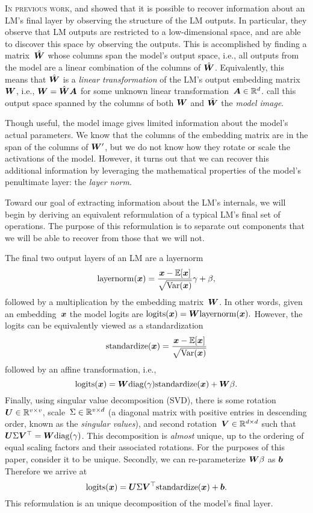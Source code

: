 \documentclass{article}
\newcommand\layernorm{\mathrm{layernorm}}
\newcommand\standardize{\mathrm{standardize}}
\newcommand\logits{\mathrm{logits}}
\newcommand\diag{\mathrm{diag}}
\begin{document}
\lettrine{I}{n previous work,} \citet{Finlayson2024LogitsOA} and \citet{Carlini2024StealingPO} showed that it is possible to recover information about an LM's final layer by observing the structure of the LM outputs.
In particular, they observe that LM outputs are restricted to a low-dimensional space, and are able to discover this space by observing the outputs.
This is accomplished by finding a matrix~\(\hat{{\bm{W}}}\) whose columns span the model's output space, i.e., all outputs from the model are a linear combination of the columns of \(\hat{{\bm{W}}}\).
Equivalently, this means that \(\hat{{\bm{W}}}\) is a \emph{linear transformation} of the LM's output embedding matrix~\({\bm{W}}\), i.e., \({\bm{W}}=\hat{{\bm{W}}}{\bm{A}}\) for some unknown linear transformation~\({\bm{A}}\in\mathbb{R}^d\).
\citeauthor{Finlayson2024LogitsOA} call this output space spanned by the columns of both \({\bm{W}}\) and \(\hat{{\bm{W}}}\) the \textit{model image}. 

Though useful, the model image gives limited information about the model's actual parameters.
We know that the columns of the embedding matrix are in the span of the columns of \({\bm{W}}'\),
but we do not know how they rotate or scale the activations of the model.
However, it turns out that we can recover this additional information by leveraging the mathematical properties of the model's penultimate layer: the \textit{layer norm}.

Toward our goal of extracting information about the LM's internals,
we will begin by deriving an equivalent reformulation 
of a typical LM's final set of operations.
The purpose of this reformulation is to separate out components 
that we will be able to recover from those that we will not.

The final two output layers of an LM are a layernorm
\[\layernorm(\vx)=\frac{\vx-\E[\vx]}{\sqrt{\Var(\vx)}}\gamma + \beta,\]
followed by a multiplication by the embedding matrix~\({\bm{W}}\). 
In other words, given an embedding~\({\bm{x}}\)
the model logits are \(\logits(\vx)=\mW\layernorm(\vx).\)
However, the logits can be equivalently viewed as a standardization
\[\standardize(\vx)=\frac{\vx-\E[\vx]}{\sqrt{\Var(\vx)}}\]
followed by an affine transformation, i.e.,
\[\logits(\vx)=\mW\diag(\gamma)\standardize(\vx) + \mW\beta.\]
Finally, using singular value decomposition (SVD),
there is some rotation~\({\bm{U}}\in\mathbb{R}^{v\times v}\),
scale~\(\Sigma\in\mathbb{R}^{v\times d}\) 
(a diagonal matrix with positive entries in descending order, known as the \emph{singular values}),
and second rotation~\({\bm{V}}\in\mathbb{R}^{d\times d}\)
such that \(\mU\Sigma\mV^\top=\mW\diag(\gamma)\).
This decomposition is \emph{almost} unique,
up to the ordering of equal scaling factors and their associated rotations.
For the purposes of this paper, consider it to be unique.
Secondly, we can re-parameterize \({\bm{W}}\beta\) as \({\bm{b}}\)
Therefore we arrive at 
\[\logits(\vx)=\mU\Sigma\mV^\top\standardize(\vx)+\vb.\]
This reformulation is an unique decomposition of the model's final layer.
\end{document}
